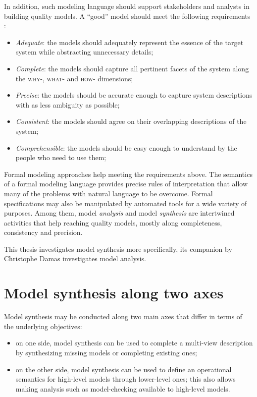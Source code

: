 In addition, such modeling language should support stakeholders and analysts in building quality models. A ``good'' model should meet the following requirements \cite{VanLamsweerde:2009}:

\begin{itemize}
\item \emph{Adequate}: the models should adequately represent the essence of the target system while abstracting unnecessary details;
\item \emph{Complete}: the models should capture all pertinent facets of the system along the \textsc{why-}, \textsc{what-} and \textsc{how-} dimensions;
\item \emph{Precise}: the models should be accurate enough to capture system descriptions with as less ambiguity as possible;
\item \emph{Consistent}: the models should agree on their overlapping descriptions of the system;
\item \emph{Comprehensible}: the models should be easy enough to understand by the people who need to use them;
\end{itemize}

Formal modeling approaches help meeting the requirements above. The semantics of a formal modeling language provides precise rules of interpretation that allow many of the problems with natural language to be overcome. Formal specifications may also be manipulated by automated tools for a wide variety of purposes. Among them, model \emph{analysis} and model \emph{synthesis} are intertwined activities that help reaching quality models, mostly along completeness, consistency  and precision.

This thesis investigates model synthesis more specifically, its companion by Christophe Damas \cite{Damas:2011} investigates model analysis.

\section{Model synthesis along two axes}

Model synthesis may be conducted along two main axes that differ in terms of the underlying objectives:

\begin{itemize}
\item on one side, model synthesis can be used to complete a multi-view description by synthesizing missing models or completing existing ones;
\item on the other side, model synthesis can be used to define an operational semantics for high-level models through lower-level ones; this also allows making analysis such as model-checking available to high-level models.
\end{itemize}

